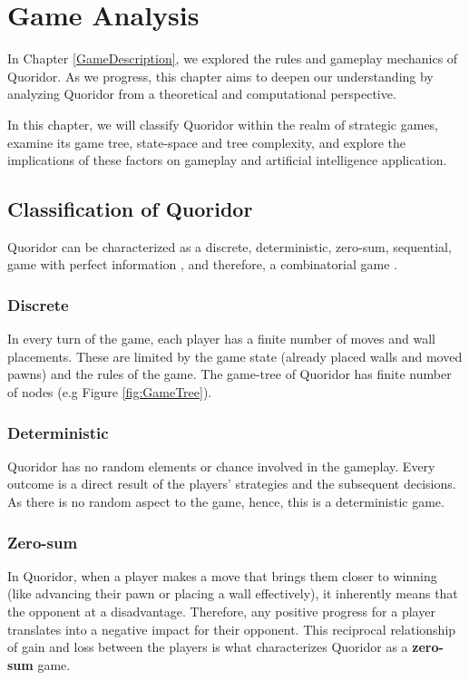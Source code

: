\chapter{Game Analysis}
\label{GameAnalysis}

In Chapter \ref{GameDescription}, we explored the rules and gameplay mechanics of Quoridor.
As we progress, this chapter aims to deepen our understanding by analyzing Quoridor from a
theoretical and computational perspective.

In this chapter, we will classify Quoridor within the realm of strategic games, examine its game tree, state-space and tree complexity, and explore the implications of these factors on gameplay and artificial intelligence application.

\section{Classification of Quoridor}

Quoridor can be characterized as a discrete, deterministic, zero-sum, sequential, game with perfect
information \citep{Glendenning2002MasteringQ}, and therefore, a combinatorial game \citep{GameTheoryBook}. 

\subsection{Discrete}
In every turn of the game, each player has a finite number of moves and wall placements. These are limited by the game state (already placed walls and moved pawns) and the rules of the game. The game-tree of Quoridor has finite number of nodes (e.g Figure \ref{fig:GameTree}).

\subsection{Deterministic}
Quoridor has no random elements or chance involved in the gameplay. Every outcome is a direct result of the players' strategies and the subsequent decisions. As there is no random aspect to the game, hence, this is a deterministic game.

\subsection{Zero-sum}
In Quoridor, when a player makes a move that brings them closer to winning (like advancing their pawn or placing a wall effectively), it inherently means that the opponent at a disadvantage. Therefore, any positive progress for a player translates into a negative impact for their opponent. This reciprocal relationship of gain and loss between the players is what characterizes Quoridor as a \textbf{zero-sum} game.

